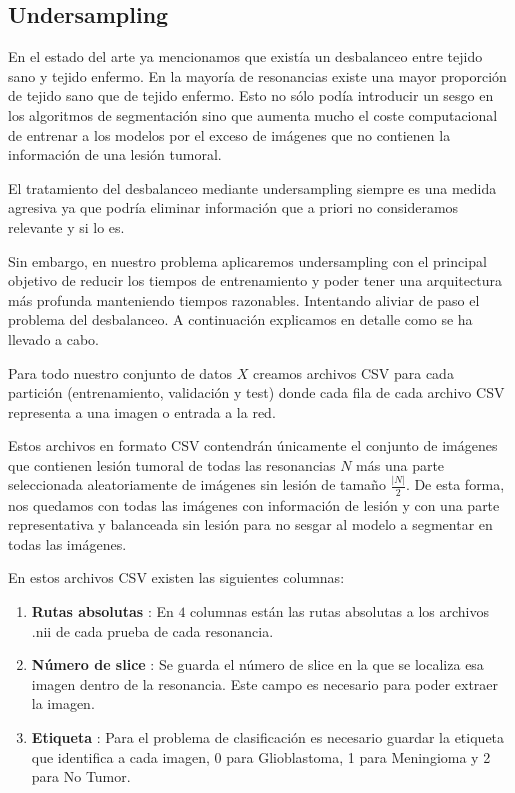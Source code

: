 \subsection{Undersampling}

En el estado del arte ya mencionamos que existía un desbalanceo entre tejido sano y tejido enfermo. En la mayoría de resonancias existe una mayor proporción de tejido sano que de tejido enfermo. Esto no sólo podía introducir un sesgo en los algoritmos de segmentación sino que aumenta mucho el coste computacional de entrenar a los modelos por el exceso de imágenes que no contienen la información de una lesión tumoral. 

El tratamiento del desbalanceo mediante undersampling siempre es una medida agresiva ya que podría eliminar información que a priori no consideramos relevante y si lo es.

Sin embargo, en nuestro problema aplicaremos undersampling con el principal objetivo de reducir los tiempos de entrenamiento y poder tener una arquitectura más profunda manteniendo tiempos razonables. Intentando aliviar de paso el problema del desbalanceo. A continuación explicamos en detalle como se ha llevado a cabo.

Para todo nuestro conjunto de datos $X$ creamos archivos CSV para cada partición (entrenamiento, validación y test) donde cada fila de cada archivo CSV representa a una imagen o entrada a la red. 

Estos archivos en formato CSV contendrán únicamente el conjunto de imágenes que contienen lesión tumoral de todas las resonancias $N$ más una parte seleccionada aleatoriamente de imágenes sin lesión de tamaño $\frac{|N|}{2}$. De esta forma, nos quedamos con todas las imágenes con información de lesión y con una parte representativa y balanceada sin lesión para no sesgar al modelo a segmentar en todas las imágenes.

En estos archivos CSV existen las siguientes columnas:

\begin{enumerate}
	\item \textbf{Rutas absolutas} : En $4$ columnas están las rutas absolutas a los archivos .nii de cada prueba de cada resonancia.
	\item \textbf{Número de slice} : Se guarda el número de slice en la que se localiza esa imagen dentro de la resonancia. Este campo es necesario para poder extraer la imagen.
	\item \textbf{Etiqueta} : Para el problema de clasificación es necesario guardar la etiqueta que identifica a cada imagen, 0 para Glioblastoma, 1 para Meningioma y 2 para No Tumor.
\end{enumerate}

